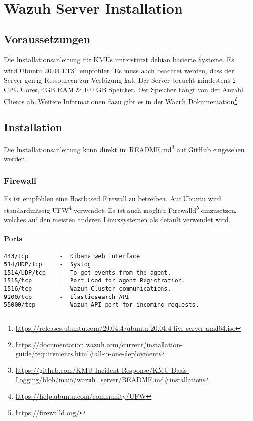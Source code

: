 \chapter{Wazuh Server Installation}

\section{Voraussetzungen}
Die Installationsanleitung für KMUs unterstützt debian basierte Systeme.
Es wird Ubuntu 20.04 LTS\footnote{\href{https://releases.ubuntu.com/20.04.4/ubuntu-20.04.4-live-server-amd64.iso}{https://releases.ubuntu.com/20.04.4/ubuntu-20.04.4-live-server-amd64.iso}} empfohlen.
Es muss auch beachtet werden, dass der Server genug Ressourcen zur Verfügung hat.
Der Server braucht mindestens 2 CPU Cores, 4GB RAM \& 100 GB Speicher.
Der Speicher hängt von der Anzahl Clients ab.
Weitere Informationen dazu gibt es in der Wazuh Dokumentation\footnote{\href{https://documentation.wazuh.com/current/installation-guide/requirements.html\#all-in-one-deployment}{https://documentation.wazuh.com/current/installation-guide/requirements.html\#all-in-one-deployment}}.

\section{Installation}
Die Installationsanleitung kann direkt im README.md\footnote{\href{https://github.com/KMU-Incident-Response/KMU-Basis-Logging/blob/main/wazuh\_server/README.md\#installation}{https://github.com/KMU-Incident-Response/KMU-Basis-Logging/blob/main/wazuh\_server/README.md\#installation}} auf GitHub eingesehen werden.


\subsection{Firewall}
Es ist empfohlen eine Hostbased Firewall zu betreiben.
Auf Ubuntu wird standardmässig UFW\footnote{\href{https://help.ubuntu.com/community/UFW}{https://help.ubuntu.com/community/UFW}} verwendet.
Es ist auch möglich Firewalld\footnote{\href{https://firewalld.org/}{https://firewalld.org/}} einzusetzen, welches auf den meisten anderen Linuxsystemen als default verwendet wird.

\subsubsection{Ports}
\begin{lstlisting}
443/tcp         -  Kibana web interface
514/UDP/tcp     -  Syslog
1514/UDP/tcp    -  To get events from the agent.
1515/tcp        -  Port Used for agent Registration.
1516/tcp        -  Wazuh Cluster communications.
9200/tcp        -  Elasticsearch API
55000/tcp       -  Wazuh API port for incoming requests.
\end{lstlisting}




